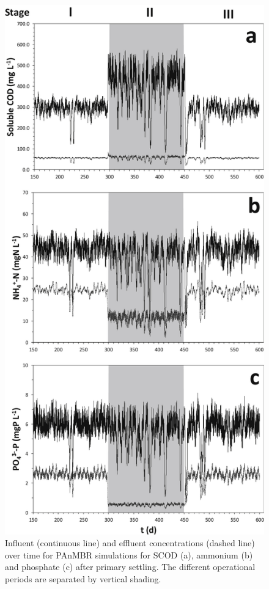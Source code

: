\begin{figure}[H]
    \centering
    \includegraphics[width=1\linewidth,height=0.9\textheight,keepaspectratio]{./Chap2/simulations/dynamic_output.jpg}
    \caption{Influent (continuous line) and effluent concentrations (dashed line) over time for PAnMBR simulations for SCOD (a), ammonium (b) and phosphate (c) after primary settling. The different operational periods are separated by vertical shading.}
    \label{fig:ch2_dyn_sol}
\end{figure}

